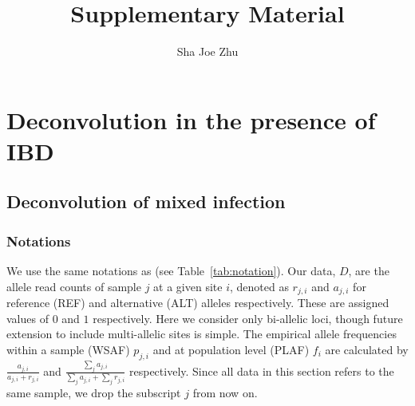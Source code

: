 \documentclass[9pt,lineno]{elife}
\title{Supplementary Material}
\author{Sha Joe Zhu}
\date{}
\begin{document}
\maketitle{}

\tableofcontents


\newpage
%



\section{Deconvolution in the presence of IBD}




\subsection{Deconvolution of mixed infection}

\subsubsection{Notations}
We use the same notations as \citet{Zhu2017} (see Table~\ref{tab:notation}). Our data, $D$, are the allele read counts of sample $j$ at a given site $i$, denoted as $r_{j,i}$ and $a_{j,i}$ for reference (REF) and alternative (ALT) alleles respectively.  These are assigned values of $0$ and $1$ respectively. Here we consider only bi-allelic loci, though future extension to include multi-allelic sites is simple.  The empirical allele frequencies within a sample (WSAF) $p_{j,i}$ and at population level (PLAF) $f_i$ are calculated by $ \frac{a_{j,i}}{a_{j,i} + r_{j,i}}$ and $ \frac{\sum_j a_{j,i}}{\sum_j a_{j,i} + \sum_j r_{j,i}}$ respectively. Since all data in this section refers to the same sample, we drop the subscript $j$ from now on.
\end{document}
